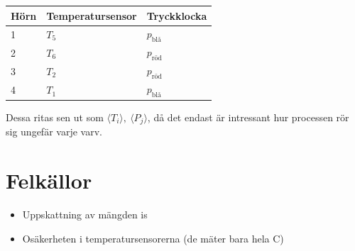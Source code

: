 \documentclass[11pt]{article}
\begin{document}
\begin{table}[h]
\centering
\label{my-label}
\begin{tabular}{l|l|l}
Hörn & Temperatursensor & Tryckklocka      \\ \hline
1    & $T_5$            & $p_{\text{blå}}$ \\ \hline
2    & $T_6$            & $p_{\text{röd}}$ \\ \hline
3    & $T_2$            & $p_{\text{röd}}$ \\ \hline
4    & $T_1$            & $p_{\text{blå}}$ \\ \hline
\end{tabular}
\end{table}

Dessa ritas sen ut som $\langle T_i \rangle, \ \langle P_j \rangle$, då det endast är intressant hur processen rör sig ungefär varje varv.

\section{Felkällor}

\begin{itemize}
    \item Uppskattning av mängden is
    \item Osäkerheten i temperatursensorerna (de mäter bara hela \degree C)
\end{itemize}
\end{document}
